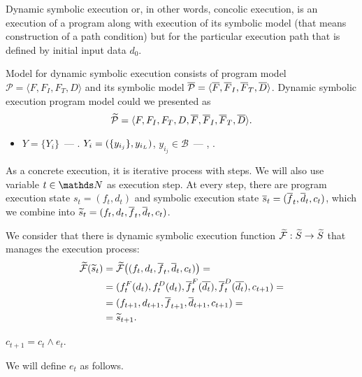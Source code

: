 
Dynamic symbolic execution or, in other words, concolic execution,
is an execution of a program along with execution of its symbolic model
(that means construction of a path condition) but for the particular
execution path that is defined by initial input data $d_0$.


Model for dynamic symbolic execution consists of program model
$\mathcal{P} = \langle F, F_I, F_T, D \rangle$ and its symbolic model
$\overline{\mathcal{P}} = \langle \overline{F}, \overline{F}_I, \overline{F}_T, \overline{D} \rangle$.
Dynamic symbolic execution program model could we presented as
\[\widetilde{\mathcal{P}} = \langle F, F_I, F_T, D,
\overline{F}, \overline{F}_I, \overline{F}_T, \overline{D} \rangle.\]

\begin{itemize}
        \item $Y = \{Y_i\}$~--- .
              $Y_i = (\{y_{i_j}\}, \textcolor{black}{y_{i_L}})$,
              $y_{i_j} \in \mathcal{B}$~--- ,
              .
\end{itemize}


As a concrete execution, it is iterative process with steps.
We will also use variable $t \in \nat$ as execution step.
At every step, there are program execution state $s_t = (f_t, d_t)$
and symbolic execution state $\overline{s}_t = (\overline{f}_t, \overline{d}_t, c_t)$,
which we combine into 
$\widetilde{s}_t = (f_t, d_t, \overline{f}_t, \overline{d}_t, c_t)$.

We consider that there is dynamic symbolic execution function
$\widetilde{\mathcal{F}}: \widetilde{S} \rightarrow \widetilde{S}$
that manages the execution process:
\begin{align}
\widetilde{\mathcal{F}}(\widetilde{s}_t) &=
    \widetilde{\mathcal{F}}\big((f_t, d_t, \overline{f}_t, \overline{d}_t, c_t)\big) = \\
    &= (f_t^F(d_t), f_t^D(d_t),
        \overline{f}_t^F(\overline{d_t}), \overline{f}_t^D(\overline{d_t}), c_{t + 1}) = \\
    &= (f_{t + 1}, d_{t + 1}, \overline{f}_{t + 1}, \overline{d}_{t + 1}, c_{t + 1}) = \\
    &= \widetilde{s}_{t + 1}.
\end{align}

$c_{t + 1} = c_t \land e_t$.

We will define $e_t$ as follows.

